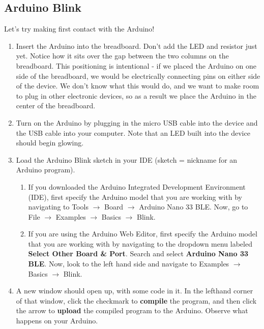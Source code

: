 \documentclass[12pt]{article}
\begin{document}
\subsection*{Arduino Blink}
Let’s try making first contact with the Arduino!
\begin{enumerate}
	
\item Insert the Arduino into the breadboard. Don't add the LED and
  resistor just yet. Notice how it sits over the gap between the two
  columns on the breadboard. This positioning is intentional - if we
  placed the Arduino on one side of the breadboard, we would be
  electrically connecting pins on either side of the device. We don't
  know what this would do, and we want to make room to plug in other
  electronic devices, so as a result we place the Arduino in the
  center of the breadboard.
		    
\item Turn on the Arduino by plugging in the micro USB cable into the
  device and the USB cable into your computer. Note that an LED built
  into the device should begin glowing.
		    
\item Load the Arduino Blink sketch in your IDE (sketch = nickname for
  an Arduino program).

  \begin{enumerate}
  \item If you downloaded the Arduino Integrated Development
    Environment (IDE), first specify the Arduino model that you are
    working with by navigating to Tools $\rightarrow$ Board
    $\rightarrow$ Arduino Nano 33 BLE. Now, go to File $\rightarrow$
    Examples $\rightarrow$ Basics $\rightarrow$ Blink.
        		    
  \item If you are using the Arduino Web Editor, first specify the
    Arduino model that you are working with by navigating to the
    dropdown menu labeled \textbf{Select Other Board \& Port}. Search
    and select \textbf{Arduino Nano 33 BLE}. Now, look to the left
    hand side and navigate to Examples $\rightarrow$ Basics
    $\rightarrow$ Blink.

  \end{enumerate}
    	        
\item A new window should open up, with some code in it. In the
  lefthand corner of that window, click the checkmark to
  \textbf{compile} the program, and then click the arrow to
  \textbf{upload} the compiled program to the Arduino. Observe what
  happens on your Arduino.


\end{enumerate}
\end{document}
